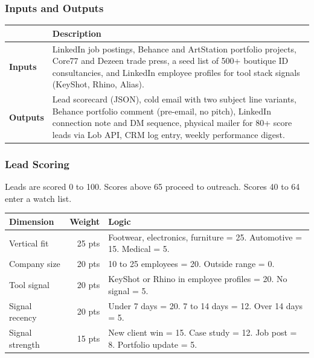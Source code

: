 \documentclass[11pt, letterpaper]{article}
\begin{document}
\subsubsection{Inputs and Outputs}

\begin{table}[H]
\centering
\begin{tabularx}{\linewidth}{@{} l X @{}}
  \toprule
  & \textbf{Description} \\
  \midrule
  \textbf{Inputs} &
  LinkedIn job postings, Behance and ArtStation portfolio projects,
  Core77 and Dezeen trade press, a seed list of 500+ boutique ID consultancies,
  and LinkedIn employee profiles for tool stack signals (KeyShot, Rhino, Alias). \\[0.5em]
  \textbf{Outputs} &
  Lead scorecard (JSON), cold email with two subject line variants, Behance
  portfolio comment (pre-email, no pitch), LinkedIn connection
  note and DM sequence, physical mailer for 80+ score leads
  via Lob API, CRM log entry, weekly performance digest. \\
  \bottomrule
\end{tabularx}
\end{table}

\subsubsection{Lead Scoring}

Leads are scored 0 to 100. Scores above 65 proceed to outreach. Scores 40
to 64 enter a watch list.

\begin{table}[H]
\centering
\begin{tabularx}{\linewidth}{@{} l r X @{}}
  \toprule
  \textbf{Dimension} & \textbf{Weight} & \textbf{Logic} \\
  \midrule
  Vertical fit    & 25 pts & Footwear, electronics, furniture = 25. Automotive = 15. Medical = 5. \\
  Company size    & 20 pts & 10 to 25 employees = 20. Outside range = 0. \\
  Tool signal     & 20 pts & KeyShot or Rhino in employee profiles = 20. No signal = 5. \\
  Signal recency  & 20 pts & Under 7 days = 20. 7 to 14 days = 12. Over 14 days = 5. \\
  Signal strength & 15 pts & New client win = 15. Case study = 12. Job post = 8. Portfolio update = 5. \\
  \bottomrule
\end{tabularx}
\end{table}
\end{document}
